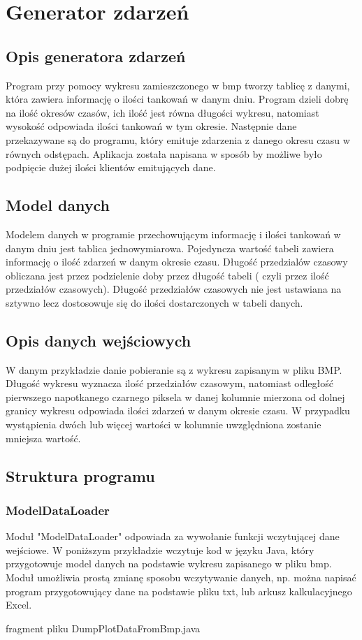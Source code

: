 \newpage
\section{Generator zdarzeń}
\label{sec:eventgenerator}

\subsection{Opis generatora zdarzeń}
Program przy pomocy wykresu zamieszczonego w bmp tworzy tablicę z danymi, która zawiera informację o ilości tankowań w danym dniu. Program dzieli dobrę na ilość okresów czasów, ich ilość jest równa długości wykresu, natomiast wysokość odpowiada ilości tankowań w tym okresie. Następnie dane przekazywane są do programu, który emituje zdarzenia z danego okresu czasu w równych odstępach. Aplikacja została napisana w sposób by możliwe było podpięcie dużej ilości klientów emitujących dane. 
\subsection{Model danych}
Modelem danych w programie przechowującym informację i ilości tankowań w danym dniu jest tablica jednowymiarowa. Pojedyncza wartość tabeli zawiera informację o ilość zdarzeń w danym okresie czasu. Długość przedzialów czasowy obliczana jest przez podzielenie doby przez długość tabeli ( czyli przez ilość przedziałów czasowych). Długość przedziałów czasowych nie jest ustawiana na sztywno lecz dostosowuje się do ilości dostarczonych w tabeli danych. 
\subsection{Opis danych wejściowych}
W danym przykładzie danie pobieranie są z wykresu zapisanym w pliku BMP. Długość wykresu wyznacza ilość przedziałów czasowym, natomiast odległość pierwszego napotkanego czarnego piksela w danej kolumnie mierzona od dolnej granicy wykresu odpowiada  ilości zdarzeń w danym okresie czasu. W przypadku wystąpienia dwóch lub więcej wartości w kolumnie uwzględniona zostanie mniejsza wartość.
\subsection{Struktura programu}
\subsubsection {ModelDataLoader}
Moduł "ModelDataLoader" odpowiada za wywołanie funkcji wczytującej dane wejściowe. W poniższym przykładzie wczytuje kod w języku Java, który przygotowuje model danych na podstawie wykresu zapisanego w pliku bmp. Moduł umożliwia prostą zmianę sposobu wczytywanie danych, np. można napisać program przygotowujący dane na podstawie pliku txt, lub arkusz kalkulacyjnego Excel.

fragment pliku DumpPlotDataFromBmp.java

